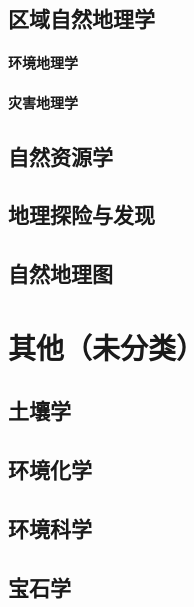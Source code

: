 \documentclass[UTF8]{../NatureUniverse}
\begin{document}
\section{区域自然地理学}
    \subsubsection{环境地理学}
    \subsubsection{灾害地理学}
\section{自然资源学}
\section{地理探险与发现}
\section{自然地理图}









\chapter{其他（未分类）}

\section{土壤学}
\section{环境化学}
\section{环境科学}
\section{宝石学}
\end{document}
